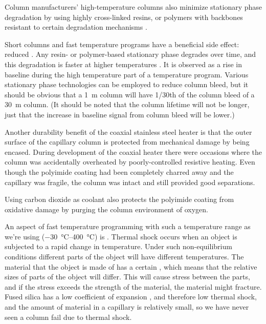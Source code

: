 Column manufacturers' high-temperature columns also minimize stationary phase
degradation by using highly cross-linked resins, or polymers with backbones
resistant to certain degradation mechanisms \autocite{Day2003}.


Short columns and fast temperature programs have a beneficial side effect:
reduced . Any resin- or polymer-based stationary phase
degrades over time, and this degradation is faster at higher temperatures
\autocite[p. 66]{Mcnair2019}. It is observed as a rise in baseline during the
high temperature part of a temperature program. Various stationary phase
technologies can be employed to reduce column bleed, but it should be obvious
that a \SI{1}{\metre} column will have \num{1/30}th  of the
column bleed of a \SI{30}{\metre} column. (It should be noted that the column
lifetime will not be longer, just that the increase in baseline signal from
column bleed will be lower.)

Another durability benefit of the coaxial stainless steel heater is that the
outer surface of the capillary column is protected from mechanical damage by
being encased. During development of the coaxial heater there were occasions
where the column was accidentally overheated by poorly-controlled resistive
heating. Even though the polyimide coating had been completely charred away and
the capillary was fragile, the column was intact and still provided good
separations.

Using carbon dioxide as coolant also protects the polyimide coating from
oxidative damage by purging the column environment of oxygen.

An aspect of fast temperature programming with such a temperature range as we're
using (\SIrange{-30}{400}{\celsius}) is . Thermal shock
occurs when an object is subjected to a rapid change in temperature. Under such
non-equilibrium conditions different parts of the object will have different
temperatures. The material that the object is made of has a certain
, which means that the relative sizes
of parts of the object will differ. This will cause stress between the parts,
and if the stress exceeds the strength of the material, the material might
fracture. Fused silica has a low coefficient of expansion , and
therefore low thermal shock, and the amount of material in a capillary is
relatively small, so we have never seen a column fail due to thermal shock.

